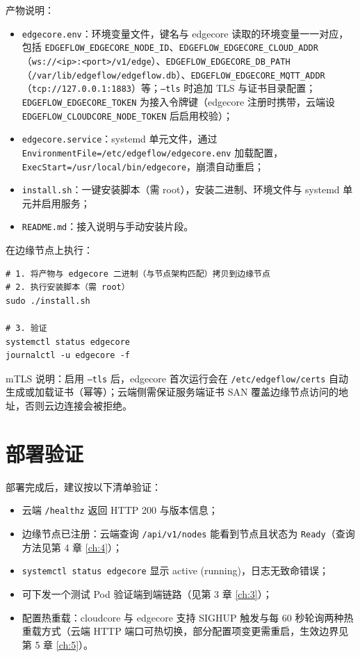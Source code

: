 产物说明：

\begin{itemize}
  \item \texttt{edgecore.env}：环境变量文件，键名与 edgecore 读取的环境变量一一对应，包括 \texttt{EDGEFLOW\_EDGECORE\_NODE\_ID}、\texttt{EDGEFLOW\_EDGECORE\_CLOUD\_ADDR}（\texttt{ws://<ip>:<port>/v1/edge}）、\texttt{EDGEFLOW\_EDGECORE\_DB\_PATH}（\texttt{/var/lib/edgeflow/edgeflow.db}）、\texttt{EDGEFLOW\_EDGECORE\_MQTT\_ADDR}（\texttt{tcp://127.0.0.1:1883}）等；\texttt{--tls} 时追加 TLS 与证书目录配置；\texttt{EDGEFLOW\_EDGECORE\_TOKEN} 为接入令牌键（edgecore 注册时携带，云端设 \texttt{EDGEFLOW\_CLOUDCORE\_NODE\_TOKEN} 后启用校验）；
  \item \texttt{edgecore.service}：systemd 单元文件，通过 \texttt{EnvironmentFile=/etc/edgeflow/edgecore.env} 加载配置，\texttt{ExecStart=/usr/local/bin/edgecore}，崩溃自动重启；
  \item \texttt{install.sh}：一键安装脚本（需 root），安装二进制、环境文件与 systemd 单元并启用服务；
  \item \texttt{README.md}：接入说明与手动安装片段。
\end{itemize}

在边缘节点上执行：

\begin{lstlisting}
# 1. 将产物与 edgecore 二进制（与节点架构匹配）拷贝到边缘节点
# 2. 执行安装脚本（需 root）
sudo ./install.sh

# 3. 验证
systemctl status edgecore
journalctl -u edgecore -f
\end{lstlisting}

mTLS 说明：启用 \texttt{--tls} 后，edgecore 首次运行会在 \texttt{/etc/edgeflow/certs} 自动生成或加载证书（幂等）；云端侧需保证服务端证书 SAN 覆盖边缘节点访问的地址，否则云边连接会被拒绝。

\section{部署验证}

部署完成后，建议按以下清单验证：

\begin{itemize}
  \item 云端 \texttt{/healthz} 返回 HTTP 200 与版本信息；
  \item 边缘节点已注册：云端查询 \texttt{/api/v1/nodes} 能看到节点且状态为 \texttt{Ready}（查询方法见第 4 章 \autoref{ch:4}）；
  \item \texttt{systemctl status edgecore} 显示 active (running)，日志无致命错误；
  \item 可下发一个测试 Pod 验证端到端链路（见第 3 章 \autoref{ch:3}）；
  \item 配置热重载：cloudcore 与 edgecore 支持 SIGHUP 触发与每 60 秒轮询两种热重载方式（云端 HTTP 端口可热切换，部分配置项变更需重启，生效边界见第 5 章 \autoref{ch:5}）。
\end{itemize}

